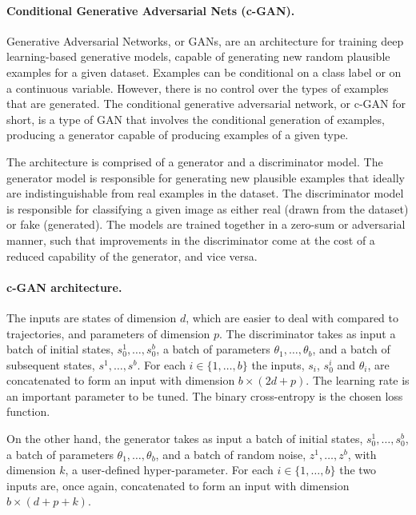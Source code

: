 \documentclass{article}
\begin{document}
\paragraph{Conditional Generative Adversarial Nets (c-GAN).} Generative Adversarial Networks, or GANs, are an architecture for training deep learning-based generative models, capable of generating new random plausible examples for a given dataset. Examples can be conditional on a class label or on a continuous variable. However, there is no control over the types of examples that are generated.
The conditional generative adversarial network, or c-GAN for short, is a type of GAN that involves the conditional generation of examples, producing a generator capable of producing examples of a given type.

The architecture is comprised of a generator and a discriminator model. The generator model is responsible for generating new plausible examples that ideally are indistinguishable from real examples in the dataset. The discriminator model is responsible for classifying a given image as either real (drawn from the dataset) or fake (generated).
The models are trained together in a zero-sum or adversarial manner, such that improvements in the discriminator come at the cost of a reduced capability of the generator, and vice versa.

\paragraph{c-GAN architecture.} 
The inputs are states of dimension $d$, which are easier to deal with compared to trajectories, and parameters of dimension $p$. 
The discriminator takes as input  a batch of initial states, $s_0^1,\dots , s_0^b$, a batch of parameters $\theta_1, \dots , \theta_b$, and a batch of subsequent states, $s^1,\dots , s^b$. For each $i\in\{ 1,\dots , b\}$ the inputs, $s_i$, $s_0^i$ and $\theta_i$, are concatenated to form an input with dimension $b\times (2d+p)$. The learning rate is an important parameter to be tuned. The binary cross-entropy is the chosen loss function.

On the other hand, the generator takes as input a batch of initial states, $s_0^1,\dots , s_0^b$, a batch of parameters $\theta_1, \dots , \theta_b$, and a batch of random noise, $z^1,\dots , z^b$, with dimension $k$, a user-defined hyper-parameter. For each $i\in\{ 1,\dots , b\}$ the two inputs are, once again, concatenated to form an input with dimension $b\times (d+p+k)$.
\end{document}

